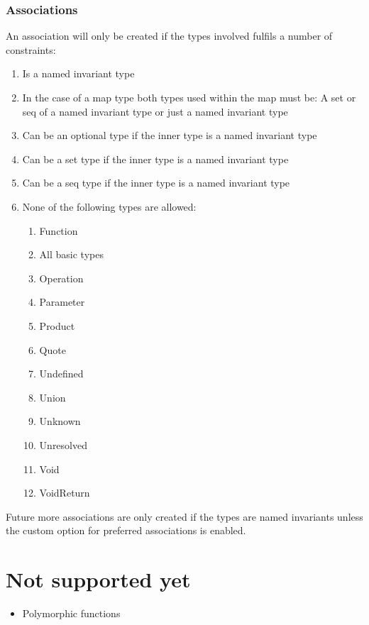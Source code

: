 \documentclass[11pt]{article} %
\begin{document}
\subsubsection{Associations}
An association will only be created if the types involved fulfils a number of constraints:
\begin{enumerate}
\item Is a named invariant type
\item In the case of a map type both types used within the map must be: A set or seq of a named invariant type  or just a named invariant type
\item Can be an optional type if the inner type is a named invariant type
\item Can be a set type if the inner type is a named invariant type
\item Can be a seq type if the inner type is a named invariant type
\item None of the following types are allowed:
	\begin{enumerate}
		\item Function
		\item All basic types
		\item Operation
		\item Parameter
		\item Product
		\item Quote
		\item Undefined
		\item Union
		\item Unknown
		\item Unresolved
		\item Void
		\item VoidReturn
	\end{enumerate}
\end{enumerate}

Future more associations are only created if the types are named invariants unless the custom option for preferred associations is enabled.
\section{Not supported yet}
\begin{itemize}
	\item Polymorphic functions
\end{itemize}
\end{document}
